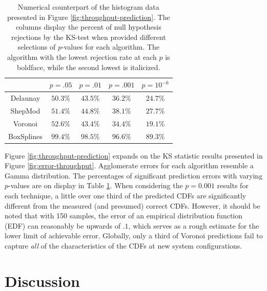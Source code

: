 \documentclass[smallextended,final]{svjour3}  %
\begin{document}
\begin{table}
  \renewcommand{\arraystretch}{1.3}
  \centering
  \begin{tabular}{c|c|c|c|c}
               & $p = .05$         & $p = .01$         & $p = .001$        & $p = 10^{-6}$\\
    \hline
    Delaunay   & $\mathbf{50.3}\%$ & $\mathit{43.5}\%$ & $\mathit{36.2}\%$ & $\mathit{24.7}\%$\\
    ShepMod    & $\mathit{51.4}\%$ & $44.8\%$          & $38.1\%$          & $27.7\%$\\
    Voronoi    & $52.6\%$          & $\mathbf{43.4}\%$ & $\mathbf{34.4}\%$ & $\mathbf{19.1}\%$\\
    BoxSplines & $99.4\%$          & $98.5\%$          & $96.6\%$          & $89.3\%$\\
  \end{tabular}
  \caption{Numerical counterpart of the histogram data presented in
    Figure \ref{fig:throughput-prediction}. The columns display the
    percent of null hypothesis rejections by the KS-test when provided
    different selections of $p$-values for each algorithm. The
    algorithm with the lowest rejection rate at each $p$ is boldface,
    while the second lowest is italicized.}
  \label{table:null-hypothesis-results}
\end{table}



Figure \ref{fig:throughput-prediction} expands on the KS statistic
results presented in Figure \ref{fig:error-throughput}. Agglomerate
errors for each algorithm resemble a Gamma distribution. The
percentages of significant prediction errors with varying $p$-values
are on display in Table \ref{table:null-hypothesis-results}. When
considering the $p=0.001$ results for each technique, a little over
one third of the predicted CDFs are significantly different from the
measured (and presumed) correct CDFs. However, it should be noted that
with 150 samples, the error of an empirical distribution function
(EDF) can reasonably be upwards of $.1$, which serves as a rough
estimate for the lower limit of achievable error. Globally, only a
third of Voronoi predictions fail to capture \textit{all} of the
characteristics of the CDFs at new system configurations.

\section{Discussion}
\label{sec:discussion}
\end{document}
